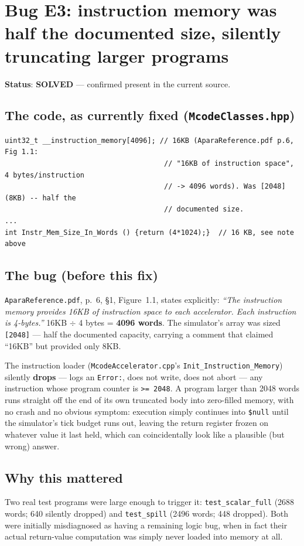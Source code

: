 \documentclass[11pt,a4paper]{report}
\begin{document}
\section{Bug E3: instruction memory was half the documented size, silently truncating larger programs}

\textbf{Status}: \textbf{SOLVED} --- confirmed present in the current source.

\subsection*{The code, as currently fixed (\texttt{McodeClasses.hpp})}
\begin{lstlisting}[caption={\texttt{McodeClasses.hpp}, lines 139, 143 (current, fixed state)}]
uint32_t __instruction_memory[4096]; // 16KB (AparaReference.pdf p.6, Fig 1.1:
                                      // "16KB of instruction space", 4 bytes/instruction
                                      // -> 4096 words). Was [2048] (8KB) -- half the
                                      // documented size.
...
int Instr_Mem_Size_In_Words () {return (4*1024);}  // 16 KB, see note above
\end{lstlisting}

\subsection*{The bug (before this fix)}
\texttt{AparaReference.pdf}, p.~6, \S1, Figure~1.1, states explicitly: \emph{``The
instruction memory provides 16KB of instruction space to each accelerator. Each
instruction is 4-bytes.''} 16KB $\div$ 4 bytes = \textbf{4096 words}. The simulator's array
was sized \texttt{[2048]} --- half the documented capacity, carrying a comment that claimed
``16KB'' but provided only 8KB.

The instruction loader (\texttt{McodeAccelerator.cpp}'s \texttt{Init\_Instruction\_Memory})
silently \textbf{drops} --- logs an \texttt{Error:}, does not write, does not abort --- any
instruction whose program counter is \texttt{>= 2048}. A program larger than 2048 words runs
straight off the end of its own truncated body into zero-filled memory, with no crash and no
obvious symptom: execution simply continues into \texttt{\$null} until the simulator's tick
budget runs out, leaving the return register frozen on whatever value it last held, which
can coincidentally look like a plausible (but wrong) answer.

\subsection*{Why this mattered}
Two real test programs were large enough to trigger it: \texttt{test\_scalar\_full} (2688
words; 640 silently dropped) and \texttt{test\_spill} (2496 words; 448 dropped). Both were
initially misdiagnosed as having a remaining logic bug, when in fact their actual
return-value computation was simply never loaded into memory at all.
\end{document}
